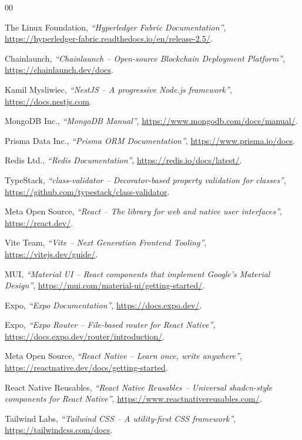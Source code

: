 \begin{thebibliography}{00}

 The Linux Foundation, \textit{``Hyperledger Fabric Documentation''}, \url{https://hyperledger-fabric.readthedocs.io/en/release-2.5/}.

 Chainlaunch, \textit{``Chainlaunch -- Open-source Blockchain Deployment Platform''}, \url{https://chainlaunch.dev/docs}.

 Kamil Mysliwiec, \textit{``NestJS -- A progressive Node.js framework''}, \url{https://docs.nestjs.com}.

 MongoDB Inc., \textit{``MongoDB Manual''}, \url{https://www.mongodb.com/docs/manual/}.

 Prisma Data Inc., \textit{``Prisma ORM Documentation''}, \url{https://www.prisma.io/docs}.

 Redis Ltd., \textit{``Redis Documentation''}, \url{https://redis.io/docs/latest/}.

 TypeStack, \textit{``class-validator -- Decorator-based property validation for classes''}, \url{https://github.com/typestack/class-validator}.

 Meta Open Source, \textit{``React -- The library for web and native user interfaces''}, \url{https://react.dev/}.

 Vite Team, \textit{``Vite -- Next Generation Frontend Tooling''}, \url{https://vitejs.dev/guide/}.

 MUI, \textit{``Material UI -- React components that implement Google's Material Design''}, \url{https://mui.com/material-ui/getting-started/}.

 Expo, \textit{``Expo Documentation''}, \url{https://docs.expo.dev/}.

 Expo, \textit{``Expo Router -- File-based router for React Native''}, \url{https://docs.expo.dev/router/introduction/}.

 Meta Open Source, \textit{``React Native -- Learn once, write anywhere''}, \url{https://reactnative.dev/docs/getting-started}.

 React Native Reusables, \textit{``React Native Reusables -- Universal shadcn-style components for React Native''}, \url{https://www.reactnativereusables.com/}.

 Tailwind Labs, \textit{``Tailwind CSS -- A utility-first CSS framework''}, \url{https://tailwindcss.com/docs}.


\end{thebibliography}
